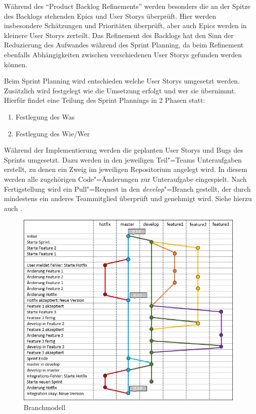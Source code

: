 Während des "`Product Backlog Refinements"' werden besonders die an der Spitze des Backlogs stehenden Epics und User Storys überprüft.
Hier werden insbesondere Schätzungen und Prioritäten überprüft, aber auch Epics werden in kleinere User Storys zerteilt.
Das Refinement des Backlogs hat den Sinn der Reduzierung des Aufwandes während des Sprint Planning, da beim Refinement ebenfalls Abhängigkeiten zwischen verschiedenen User Storys gefunden werden können.

Beim Sprint Planning wird entschieden welche User Storys umgesetzt werden.
Zusätzlich wird festgelegt wie die Umsetzung erfolgt und wer sie übernimmt.
Hierfür findet eine Teilung des Sprint Plannings in 2 Phasen statt:
\begin{enumerate}
	\item Festlegung des Was
	\item Festlegung des Wie/Wer
\end{enumerate}

Während der Implementierung werden die geplanten User Storys und Bugs des Sprints umgesetzt.
Dazu werden in den jeweiligen Teil"=Teams Unteraufgaben erstellt, zu denen ein Zweig im jeweiligen Repositorium angelegt wird.
In diesem werden alle zugehörigen Code"=Änderungen zur Unteraufgabe eingespielt.
Nach Fertigstellung wird ein Pull"=Request in den \textit{develop}"=Branch gestellt, der durch mindestens ein anderes Teammitglied überprüft und genehmigt wird.
Siehe hierzu auch .

\begin{figure}[!ht]
	\centering
	\includegraphics[width=1.0\linewidth]{./ressourcen/Vorgehensmodell_Branchmodell}
	\caption{Branchmodell}
	\label{fig:sec:vorgehensmodell:branchmodell}
\end{figure}

